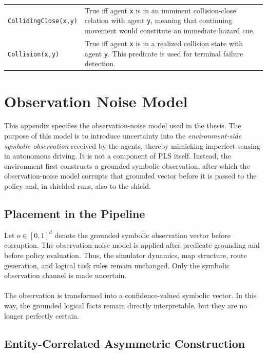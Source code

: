 \begin{table}[H]
\begin{tabularx}{\linewidth}{@{}p{3.8cm} X@{}}
\texttt{CollidingClose(x,y)}
& True iff agent \texttt{x} is in an imminent collision-close relation with agent \texttt{y}, meaning that continuing movement would constitute an immediate hazard cue. \\

\texttt{Collision(x,y)}
& True iff agent \texttt{x} is in a realized collision state with agent \texttt{y}. This predicate is used for terminal failure detection. \\

\bottomrule
\end{tabularx}
\end{table}

\section{Observation Noise Model}
\label{app:observation-noise-model}

This appendix specifies the observation-noise model used in the thesis. The purpose of this model is to introduce uncertainty into the \emph{environment-side symbolic observation} received by the agents, thereby mimicking imperfect sensing in autonomous driving. It is not a component of PLS itself. Instead, the environment first constructs a grounded symbolic observation, after which the observation-noise model corrupts that grounded vector before it is passed to the policy and, in shielded runs, also to the shield.

\subsection{Placement in the Pipeline}

Let \(o \in [0,1]^d\) denote the grounded symbolic observation vector before corruption. The observation-noise model is applied after predicate grounding and before policy evaluation. Thus, the simulator dynamics, map structure, route generation, and logical task rules remain unchanged. Only the symbolic observation channel is made uncertain.
\\
\\
The observation is transformed into a confidence-valued symbolic vector. In this way, the grounded logical facts remain directly interpretable, but they are no longer perfectly certain.

\subsection{Entity-Correlated Asymmetric Construction}

